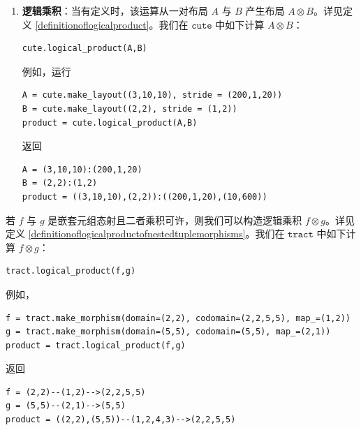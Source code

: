 \begin{enumerate}[left=0pt]
\begin{lstlisting}[language=cutedsl]
tract.logical_divide(f,g)
\end{lstlisting}
例如，
\begin{lstlisting}[language=cutedsl]
f = tract.make_morphism(domain=(4,8,4,8), codomain=(4,8,4,8), map_=(1,2,3,4))
g = tract.make_morphism(domain=(4,4), codomain=(4,8,4,8), map_=(1,3))
quotient = tract.logical_divide(f,g)
\end{lstlisting}
返回
\begin{lstlisting}[language=cutedsl]
f = (4,8,4,8)--(1,2,3,4)-->(4,8,4,8)
g = (4,4)--(1,3)-->(4,8,4,8)
quotient = ((4,4),(8,8))--(1,3,2,4)-->(4,8,4,8)
\end{lstlisting}
\item {\bf 逻辑乘积}：当有定义时，该运算从一对布局 $A$ 与 $B$ 产生布局 $A \otimes B$。详见定义 \ref{definitionoflogicalproduct}。我们在 $\texttt{cute}$ 中如下计算 $A \otimes B$：
\begin{lstlisting}[language=cutedsl]
cute.logical_product(A,B)
\end{lstlisting}
例如，运行
\begin{lstlisting}[language=cutedsl]
A = cute.make_layout((3,10,10), stride = (200,1,20))
B = cute.make_layout((2,2), stride = (1,2))
product = cute.logical_product(A,B)
\end{lstlisting}
返回
\begin{lstlisting}[language=cutedsl]
A = (3,10,10):(200,1,20)
B = (2,2):(1,2)
product = ((3,10,10),(2,2)):((200,1,20),(10,600))
\end{lstlisting}

\end{enumerate}

若 $f$ 与 $g$ 是嵌套元组态射且二者乘积可许，则我们可以构造逻辑乘积 $f \otimes g$。详见定义 \ref{definitionoflogicalproductofnestedtuplemorphisms}。我们在 $\texttt{tract}$ 中如下计算 $f \otimes g$：
\begin{lstlisting}[language=cutedsl]
tract.logical_product(f,g)
\end{lstlisting}
\clearpage
例如，
\begin{lstlisting}[language=cutedsl]
f = tract.make_morphism(domain=(2,2), codomain=(2,2,5,5), map_=(1,2))
g = tract.make_morphism(domain=(5,5), codomain=(5,5), map_=(2,1))
product = tract.logical_product(f,g)
\end{lstlisting}
返回
\begin{lstlisting}[language=cutedsl]
f = (2,2)--(1,2)-->(2,2,5,5)
g = (5,5)--(2,1)-->(5,5)
product = ((2,2),(5,5))--(1,2,4,3)-->(2,2,5,5)
\end{lstlisting}

